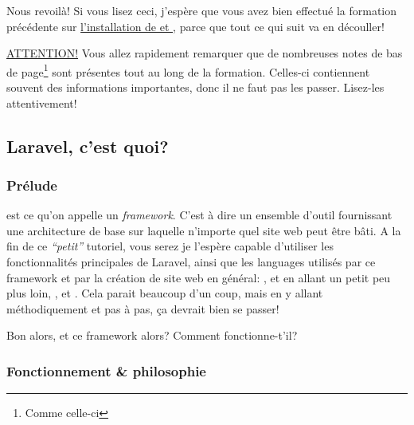 
Nous revoilà! Si vous lisez ceci, j'espère que vous avez bien effectué la formation précédente sur \href{https://github.com/nhitec/N-HiTec-Docker-tutorial-pdf/releases}{l'installation de \docker{} et \laravelsail{}}, parce que tout ce qui suit va en découller!

\underline{ATTENTION!} Vous allez rapidement remarquer que de nombreuses notes de bas de page\footnote{Comme celle-ci} sont présentes tout au long de la formation. Celles-ci contiennent souvent des informations importantes, donc il ne faut pas les passer. Lisez-les attentivement!

\subsection{Laravel, c'est quoi?}

\subsubsection[Prélude]{Prélude}

\laravel{}{} est ce qu'on appelle un \textit{framework}. C'est à dire un ensemble d'outil fournissant une architecture de base sur laquelle n'importe quel site web peut être bâti. A la fin de ce \textit{``petit''} tutoriel, vous serez je l'espère capable d'utiliser les fonctionnalités principales de Laravel, ainsi que les languages utilisés par ce framework et par la création de site web en général: \php{}, \html{} et en allant un petit peu plus loin, \css{}, \jquery{}  et \js{}. Cela parait beaucoup d'un coup, mais en y allant méthodiquement et pas à pas, ça devrait bien se passer!

Bon alors, et ce framework alors? Comment fonctionne-t'il?

\subsubsection[Fonctionnement et philosophie]{Fonctionnement \& philosophie}\label{sec:fonctionnement&philosophie}


